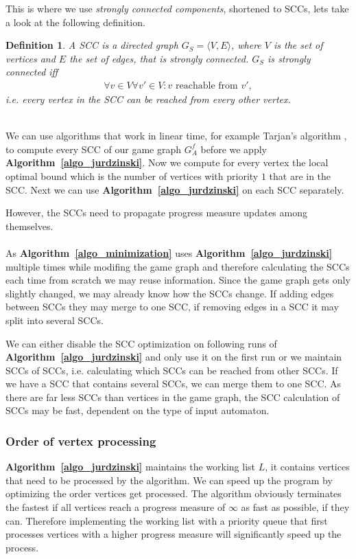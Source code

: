 \documentclass[12pt,oneside,bibliography=totoc,abstracton]{scrartcl}
\newcommand{\algoref}[1]{\textbf{Algorithm~\ref{#1}}}
\newcommand{\libref}[1]{\textbf{\cite{#1}}}
\newtheorem{mydef}{Definition}
\begin{document}
This is where we use \textit{strongly connected components}, shortened to SCCs, lets take a look at the following definition.
\begin{mydef}
	A \textnormal{SCC} is a directed graph $G_S = \langle V, E\rangle$, where $V$ is the set of
	vertices and $E$ the set of edges, that is \textnormal{strongly connected}.
	$G_S$ is \textnormal{strongly connected} iff
	\begin{align*}
		\forall v \in V \forall v' \in V : v \text{ reachable from } v',
	\end{align*}
	i.e. every vertex in the SCC can be reached from every other vertex.
\end{mydef}\quad\\
We can use algorithms that work in linear time, for example Tarjan's algorithm \libref{scc}, to compute every SCC of
our game graph $G^f_A$ before we apply \algoref{algo_jurdzinski}. Now we compute for every vertex the local
optimal bound which is the number of vertices with priority $1$ that are in the SCC. Next we can use \algoref{algo_jurdzinski}
on each SCC separately.

However, the SCCs need to propagate progress measure updates among themselves.\\\\
As \algoref{algo_minimization} uses \algoref{algo_jurdzinski} multiple times while modifing the game graph and therefore
calculating the SCCs each time from scratch we may reuse information. Since the game graph gets only slightly changed,
we may already know how the SCCs change. If adding edges between SCCs they may merge to one SCC,
if removing edges in a SCC it may split into several SCCs.

We can either disable the SCC optimization on following runs of \algoref{algo_jurdzinski} and only use it on the first
run or we maintain SCCs of SCCs, i.e. calculating which SCCs can be reached from other SCCs.
If we have a SCC that contains several SCCs, we can merge them to one SCC.
As there are far less SCCs than vertices in the game graph, the SCC calculation of SCCs may be fast,
dependent on the type of input automaton.

\subsubsection*{Order of vertex processing}
\algoref{algo_jurdzinski} maintains the working list $L$, it contains vertices that need to be processed by the algorithm.
We can speed up the program by optimizing the order vertices get processed. The algorithm obviously
terminates the fastest if all vertices reach a progress measure of $\infty$ as fast as possible, if they can.
Therefore implementing the working list with a priority queue that first processes vertices with a higher
progress measure will significantly speed up the process.
\end{document}
